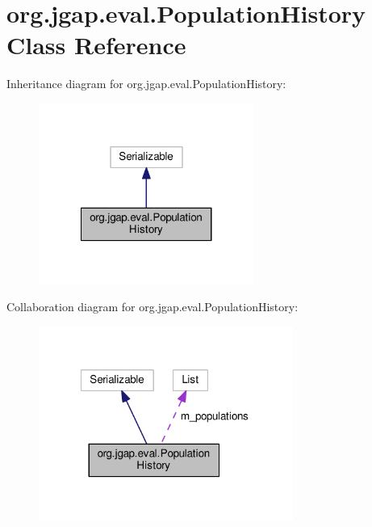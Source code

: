 \hypertarget{classorg_1_1jgap_1_1eval_1_1_population_history}{\section{org.\-jgap.\-eval.\-Population\-History Class Reference}
\label{classorg_1_1jgap_1_1eval_1_1_population_history}
}


Inheritance diagram for org.\-jgap.\-eval.\-Population\-History\-:
\nopagebreak
\begin{figure}[H]
\begin{center}
\leavevmode
\includegraphics[width=200pt]{classorg_1_1jgap_1_1eval_1_1_population_history__inherit__graph}
\end{center}
\end{figure}


Collaboration diagram for org.\-jgap.\-eval.\-Population\-History\-:
\nopagebreak
\begin{figure}[H]
\begin{center}
\leavevmode
\includegraphics[width=236pt]{classorg_1_1jgap_1_1eval_1_1_population_history__coll__graph}
\end{center}
\end{figure}
